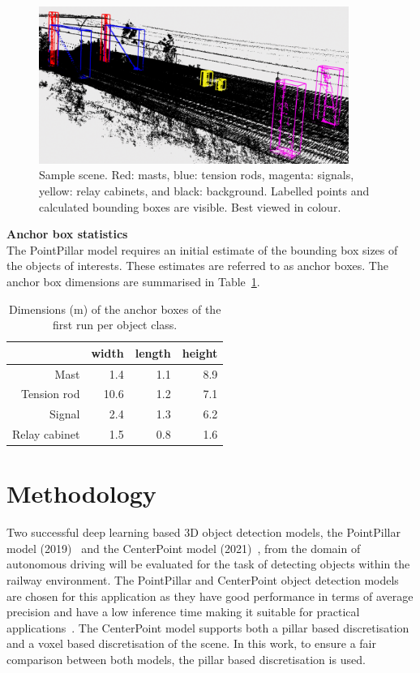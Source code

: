 \begin{figure}[ht]
    \includegraphics[width=0.9\textwidth]{Chapters/objdet/figures/run1_scene11.png}
    \caption{Sample scene. Red: masts, blue: tension rods, magenta: signals, yellow: relay cabinets, and black: background. Labelled points and calculated bounding boxes are visible. Best viewed in colour.}
    \label{fig:objdet:sample}
\end{figure}

\textbf{Anchor box statistics}\\
The PointPillar model requires an initial estimate of the bounding box sizes of the objects of interests. These estimates are referred to as anchor boxes. The anchor box dimensions are summarised in Table~\ref{tbl:objdet:abstats}.

\begin{table}[ht]
    \centering
    \begin{tabular}{rrrr}
        \toprule
         & width & length & height\\
        \midrule
        Mast & 1.4 & 1.1 & 8.9\\
        Tension rod & 10.6 & 1.2 & 7.1\\
        Signal & 2.4 & 1.3 & 6.2 \\
        Relay cabinet & 1.5 & 0.8 & 1.6 \\
        \bottomrule
    \end{tabular}
    \caption{Dimensions (m) of the anchor boxes of the first run per object class.}
    \label{tbl:objdet:abstats}
\end{table}

\section{Methodology}
Two successful deep learning based 3D object detection models, the PointPillar model (2019)~\cite{pointpillar} and the CenterPoint model (2021)~\cite{centerpoint}, from the domain of autonomous driving will be evaluated for the task of detecting objects within the railway environment. The PointPillar and CenterPoint object detection models are chosen for this application as they have good performance in terms of average precision and have a low inference time making it suitable for practical applications~\cite{guo2020deep}. The CenterPoint model supports both a pillar based discretisation and a voxel based discretisation of the scene. In this work, to ensure a fair comparison between both models, the pillar based discretisation is used.


